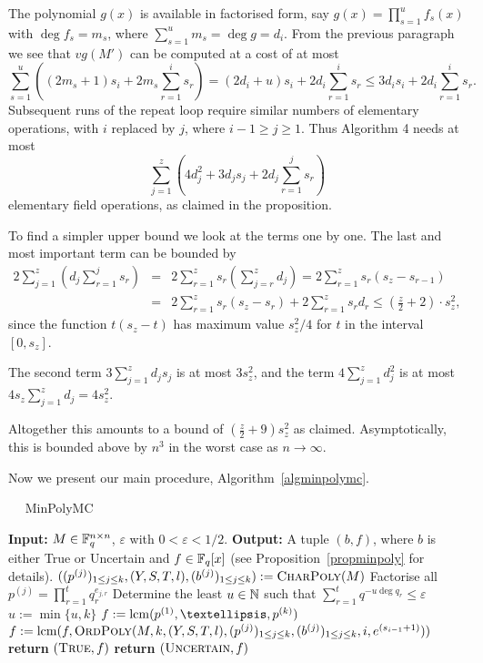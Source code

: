 The polynomial $g(x)$ is available in factorised form,
say $g(x)=\prod_{s=1}^uf_s(x)$ with $\deg f_s=m_s$,
where $\sum_{s=1}^um_s=\deg g=d_i$. From the previous
paragraph we see that $vg(M')$ can be computed at a cost of at most
\[
\sum_{s=1}^u\left((2m_s+1)s_i +2m_s\sum_{r=1}^i s_r \right)
=(2d_i+u)s_i+2d_i\sum_{r=1}^is_r \leq 3d_is_i+2d_i\sum_{r=1}^is_r.
\]
Subsequent runs of the repeat loop require similar numbers of elementary
operations, with $i$ replaced by $j$, where $i-1\geq j\geq 1$.
Thus Algorithm 4 needs at most
\[
\sum_{j=1}^z \left( 4d_j^2  + 3d_j s_j + 2d_j 
\sum_{r=1}^j s_r \right)
\]
elementary field operations, as claimed in the proposition.

To find a simpler upper bound we look at the terms one by one. The
last and most important term can be bounded by
\begin{eqnarray*}
  2\sum_{j=1}^z \left( d_j \sum_{r=1}^j s_r \right)
    &=& 2 \sum_{r=1}^z s_r \left(\sum_{j=r}^z d_j\right)
    = 2 \sum_{r=1}^z s_r (s_z - s_{r-1}) \\
    &=& 2 \sum_{r=1}^z s_r (s_z - s_r) + 2 \sum_{r=1}^z s_r d_r
    \le (\frac{z}{2}+2) \cdot s_z^2,
\end{eqnarray*}
since the function $t(s_z-t)$ has maximum value $s_z^2/4$
for $t$ in the interval $[0,s_z]$.

The second term $3\sum_{j=1}^z d_j s_j$ is at most $3s_z^2$,
and the term
$4 \sum_{j=1}^z d_j^2$ is at most $4s_z\sum_{j=1}^z d_j = 4s_z^2$.

Altogether this amounts to a bound of $(\frac{z}{2}+9)s_z^2$ as claimed.
Asymptotically, this is bounded above by $n^3$ in the worst case as
$n \to \infty$.
\proofend

\smallskip
Now we present our main procedure, Algorithm~\ref{algminpolymc}. 

\begin{algorithm}
\caption{$\quad$ \sc MinPolyMC}
\label{algminpolymc}
%
\begin{algorithmic}
\STATE \textbf{Input:} $M \in \mathbb{F}_q^{n \times n}$, $\varepsilon$ with
$0 < \varepsilon < 1/2$.
\STATE \textbf{Output:} A tuple $(b,f)$, where $b$ is either {\sc True}
or {\sc Uncertain} and $f \in \mathbb{F}_q[x]$
\STATE \hspace*{0mm}  (see
Proposition~\ref{propminpoly} for details).
\vspace*{2mm}
\STATE
       $((p^{(j)})_{1 \le j \le k},(Y,S,T,l),(b^{(j)})_{1 \le j \le k})
       := \mbox{\sc CharPoly}(M)$
\STATE Factorise all $p^{(j)} = \prod_{r=1}^t q_r^{e_{j,r}}$ 
\STATE Determine the least $u \in \mathbb{N}$ such that
 $\sum_{r=1}^t q^{-u\deg q_r} \le \varepsilon$
\STATE $u := \min\{ u,k \}$
\STATE $f := \lcm(p^{(1)}, \ldots, p^{(k)})$ 
    \STATE $f := \mathrm{lcm}(f,\mbox{\sc OrdPoly}
           (M,k,(Y,S,T,l),(p^{(j)})_{1 \le j \le k}, 
           (b^{(j)})_{1 \le j \le k},i,e^{(s_{i-1}+1)}))$
\ENDFOR
{}
    \STATE \textbf{return} $(\mbox{\sc True},f)$
\ELSE
    \STATE \textbf{return} $(\mbox{\sc Uncertain},f)$
\ENDIF
\end{algorithmic}
\end{algorithm}

